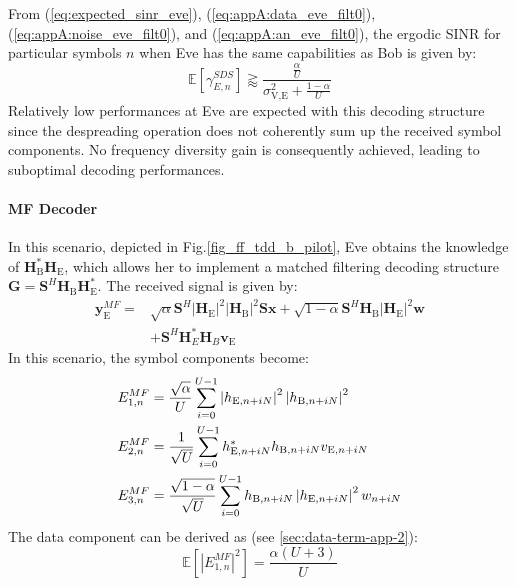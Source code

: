 \documentclass[journal,comsoc]{IEEEtran}
\newcommand{\module}[1]{\left|#1\right|}
\newcommand{\EX}[1]{\mathbb{E} \left[#1\right]}%
\newcommand{\HE}{\textbf{H}_{\text{E}}}
\newcommand{\HB}{\textbf{H}_{\text{B}}}
\newcommand{\ve}{\textbf{v}_{\text{E}}}
\newcommand{\spread}{\textbf{S}}
\newcommand{\w}{\textbf{w}}
\begin{document}
From (\ref{eq:expected_sinr_eve}), (\ref{eq:appA:data_eve_filt0}), (\ref{eq:appA:noise_eve_filt0}), and (\ref{eq:appA:an_eve_filt0}), the ergodic SINR for particular symbols $n$ when Eve has the same capabilities as Bob is given by:
\begin{equation}
\EX{\gamma_{E,n}^{SDS}} \gtrapprox \frac{\frac{\alpha}{U}}{\sigma^2_{\text{V,E}}+\frac{1-\alpha}{U}}
\label{eq:sinr_eve_filt0}
\end{equation}
Relatively low performances at Eve are expected with this decoding structure since the despreading operation does not coherently sum up the received symbol components. No frequency diversity gain is consequently achieved, leading to suboptimal decoding performances.

\paragraph{MF Decoder}
In this scenario, depicted in Fig.\ref{fig_ff_tdd_b_pilot}, Eve obtains the knowledge of $\HB^*\HE$, which allows her to implement a matched filtering decoding structure $\textbf{G} = \spread^H \HB\HE^*$. The received signal is given by:
\begin{equation}
\begin{split}
\textbf{y}_{\text{E}}^{MF} =& \sqrt{\alpha} \spread^H \module{\HE}^2 \module{\HB}^2 \spread\textbf{x} +  \sqrt{1-\alpha} \spread^H \HB\module{\HE}^2 \w\\
&+  \spread^H  \textbf{H}^*_E \textbf{H}_B \ve
\end{split}
\label{eq:rx_eve_filt1}
\end{equation}
In this scenario, the symbol components become:
\begin{equation}
\begin{split}
E_{1,n}^{MF} &= \frac{\sqrt{\alpha}}{U}\sum_{i=0}^{U-1}  \left|h_{\text{E}, n + iN}\right|^2 \left|h_{\text{B}, n + iN}\right|^2 \\
E_{2,n}^{MF} &= \frac{1}{\sqrt{U}}\sum_{i=0}^{U-1} h^*_{\text{E}, n + iN} h_{\text{B}, n + iN} v_{\text{E}, n + iN}\\
E_{3,n}^{MF} &=\frac{ \sqrt{1-\alpha}  }{\sqrt{U}}\sum_{i=0}^{U-1}    h_{\text{\text{B}}, n + iN} \left|h_{\text{E}, n + iN}\right|^2w_{n + iN}
\end{split}
\end{equation}
The data component can be derived as (see \ref{sec:data-term-app-2}):
\begin{equation}
\EX{|E_{1,n}^{MF}|^2} =  \frac{\alpha (U+3)}{U}
\label{eq:data_eve_filt1}
\end{equation}
\end{document}
